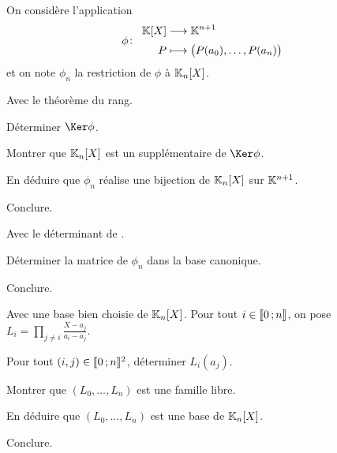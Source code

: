 \begin{exercice}
On considère l'application
\[
\fonction[\phi]{\K[X]}{\K^{n+1}}{P}{\big(P(a_0),\ldots,P(a_n)\big)}
\]
et on note $\phi_n$ la restriction de $\phi$ à $\mathbb{K}_n[X]$.
\begin{questions}
\item Avec le théorème du rang.
\begin{questions}
\item Déterminer $\Ker \phi$.

\item Montrer que $\mathbb{K}_n[X]$ est un supplémentaire de $\Ker \phi$.

\item En déduire que $\phi_n$ réalise une bijection de $\mathbb{K}_n[X]$ sur $\mathbb{K}^{n+1}$.

\item Conclure.
\end{questions}

\item Avec le déterminant de .
\begin{questions}
\item Déterminer la matrice de $\phi_n$ dans la base canonique.

\item Conclure.
\end{questions}

\item Avec une base bien choisie de $\mathbb{K}_n[X]$. Pour tout $i \in \llbracket 0\,; n \rrbracket$, on pose $L_i = \prod\limits_{j \neq i} \frac{X - a_j}{a_i - a_j}$.
\begin{questions}
\item Pour tout $(i, j) \in \llbracket 0\,; n \rrbracket^2$, déterminer $L_i(a_j)$.

\item Montrer que $(L_0,\ldots,L_n)$ est une famille libre.

\item En déduire que $(L_0,\ldots,L_n)$ est une base de $\mathbb{K}_n[X]$.

\item Conclure.
\end{questions}
\end{questions}
\end{exercice}

